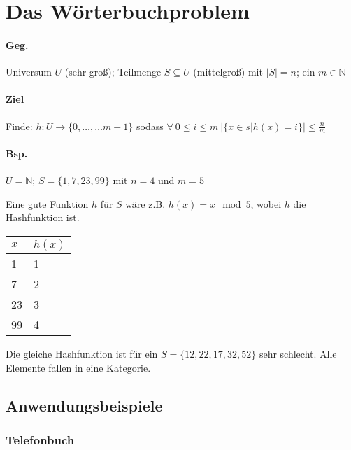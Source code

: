 \section{Das Wörterbuchproblem}

\paragraph*{Geg.} Universum $U$ (sehr groß); Teilmenge $S \subseteq U$ (mittelgroß) mit $|S|=n$; ein $m \in \mathbb{N}$

\paragraph*{Ziel} Finde: $h: U \rightarrow \{ 0,\dots,\dots m-1 \}$ sodass $\forall\ 0 \leq i \leq m\ \big| \{ x \in s | h(x)=i \} \big| \leq \frac{n}{m}$

\paragraph*{Bsp.} $U=\mathbb{N}$; $S=\{ 1,7,23,99 \}$ mit $n=4$ und $m=5$

Eine gute Funktion $h$ für $S$ wäre z.B. $h(x)=x \mod 5$, wobei $h$ die Hashfunktion ist.
\begin{table}[htb!]
\centering
\begin{tabular}{l|l}
$x$ & $h(x)$ \\ 
\hline 
1 & 1 \\ 
7 & 2 \\ 
23 & 3 \\ 
99 & 4 \\ 
\end{tabular} 
\end{table}

Die gleiche Hashfunktion ist für ein $S = \{ 12,22,17,32,52 \}$ sehr schlecht. Alle Elemente fallen in eine Kategorie.


\subsection{Anwendungsbeispiele}

\subsubsection{Telefonbuch}


